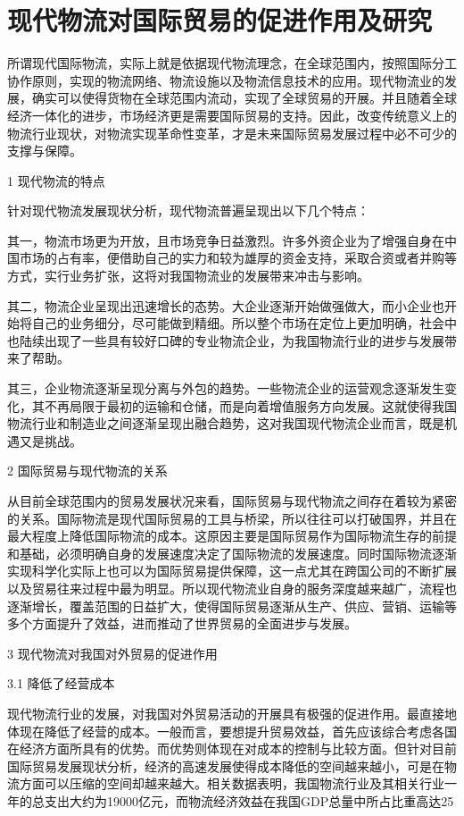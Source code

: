 \chapter{现代物流对国际贸易的促进作用及研究}
所谓现代国际物流，实际上就是依据现代物流理念，在全球范围内，按照国际分工协作原则，实现的物流网络、物流设施以及物流信息技术的应用。现代物流业的发展，确实可以使得货物在全球范围内流动，实现了全球贸易的开展。并且随着全球经济一体化的进步，市场经济更是需要国际贸易的支持。因此，改变传统意义上的物流行业现状，对物流实现革命性变革，才是未来国际贸易发展过程中必不可少的支撑与保障。

1 现代物流的特点

针对现代物流发展现状分析，现代物流普遍呈现出以下几个特点：

其一，物流市场更为开放，且市场竞争日益激烈。许多外资企业为了增强自身在中国市场的占有率，便借助自己的实力和较为雄厚的资金支持，采取合资或者并购等方式，实行业务扩张，这将对我国物流业的发展带来冲击与影响。

其二，物流企业呈现出迅速增长的态势。大企业逐渐开始做强做大，而小企业也开始将自己的业务细分，尽可能做到精细。所以整个市场在定位上更加明确，社会中也陆续出现了一些具有较好口碑的专业物流企业，为我国物流行业的进步与发展带来了帮助。

其三，企业物流逐渐呈现分离与外包的趋势。一些物流企业的运营观念逐渐发生变化，其不再局限于最初的运输和仓储，而是向着增值服务方向发展。这就使得我国物流行业和制造业之间逐渐呈现出融合趋势，这对我国现代物流企业而言，既是机遇又是挑战。

2 国际贸易与现代物流的关系

从目前全球范围内的贸易发展状况来看，国际贸易与现代物流之间存在着较为紧密的关系。国际物流是现代国际贸易的工具与桥梁，所以往往可以打破国界，并且在最大程度上降低国际物流的成本。这原因主要是国际贸易作为国际物流生存的前提和基础，必须明确自身的发展速度决定了国际物流的发展速度。同时国际物流逐渐实现科学化实际上也可以为国际贸易提供保障，这一点尤其在跨国公司的不断扩展以及贸易往来过程中最为明显。所以现代物流业自身的服务深度越来越广，流程也逐渐增长，覆盖范围的日益扩大，使得国际贸易逐渐从生产、供应、营销、运输等多个方面提升了效益，进而推动了世界贸易的全面进步与发展。

3 现代物流对我国对外贸易的促进作用

3.1 降低了经营成本

现代物流行业的发展，对我国对外贸易活动的开展具有极强的促进作用。最直接地体现在降低了经营的成本。一般而言，要想提升贸易效益，首先应该综合考虑各国在经济方面所具有的优势。而优势则体现在对成本的控制与比较方面。但针对目前国际贸易发展现状分析，经济的高速发展使得成本降低的空间越来越小，可是在物流方面可以压缩的空间却越来越大。相关数据表明，我国物流行业及其相关行业一年的总支出大约为19000亿元，而物流经济效益在我国GDP总量中所占比重高达25%

